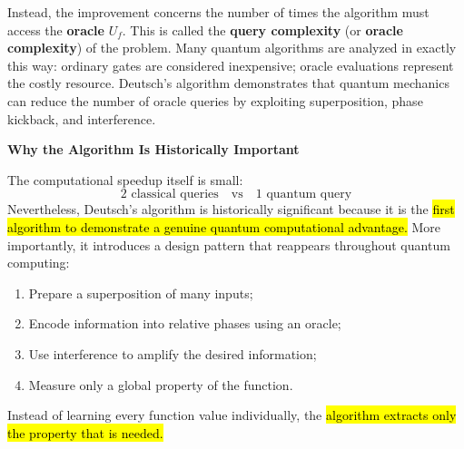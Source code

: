 \highspace
Instead, the improvement concerns the number of times the algorithm must access the \textbf{oracle} $U_f$. This is called the \textbf{query complexity} (or \textbf{oracle complexity}) of the problem. Many quantum algorithms are analyzed in exactly this way: ordinary gates are considered inexpensive; oracle evaluations represent the costly resource. Deutsch's algorithm demonstrates that quantum mechanics can reduce the number of oracle queries by exploiting superposition, phase kickback, and interference.

\newpage

\begin{flushleft}
    \textcolor{Green3}{ \textbf{Why the Algorithm Is Historically Important}}
\end{flushleft}
The computational speedup itself is small:
\begin{equation*}
    2 \text{ classical queries} \quad \text{vs} \quad 1 \text{ quantum query}
\end{equation*}
Nevertheless, Deutsch's algorithm is historically significant because it is the \hl{first algorithm to demonstrate a genuine quantum computational advantage.} More importantly, it introduces a design pattern that reappears throughout quantum computing:
\begin{enumerate}
    \item Prepare a superposition of many inputs;
    \item Encode information into relative phases using an oracle;
    \item Use interference to amplify the desired information;
    \item Measure only a global property of the function.
\end{enumerate}
Instead of learning every function value individually, the \hl{algorithm extracts only the property that is needed.}

